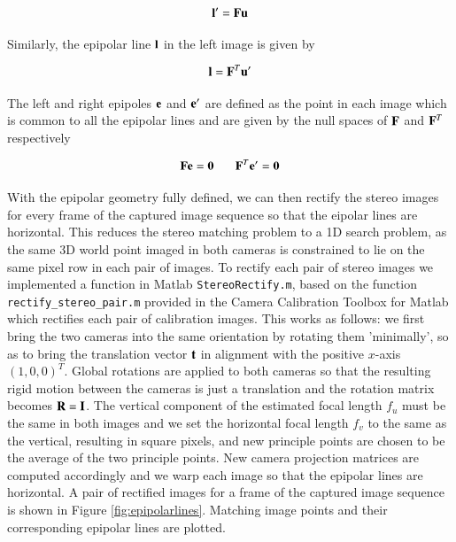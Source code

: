\begin{equation}
\mathbf{l}' = \mathbf{Fu}
\end{equation} 

Similarly, the epipolar line $\mathbf{l}$ in the left image is given by

\begin{equation*}
\mathbf{l} = \mathbf{F}^T \mathbf{u}'
\end{equation*} 

The left and right epipoles $\mathbf{e}$ and $\mathbf{e}'$ are defined as the point in each image which is common to all the epipolar lines and are given by the null spaces of $\mathbf{F}$ and $\mathbf{F}^T$ respectively

\begin{equation*}
\mathbf{Fe} = \mathbf{0} \ \ \ \ \ \ \
\mathbf{F}^T\mathbf{e}' = \mathbf{0}
\end{equation*} 

With the epipolar geometry fully defined, we can then rectify the stereo images for every frame of the captured image sequence so that the eipolar lines are horizontal. This reduces the stereo matching problem to a 1D search problem, as the same 3D world point imaged in both cameras is constrained to lie on the same pixel row in each pair of images. To rectify each pair of stereo images we implemented a function in Matlab \texttt{StereoRectify.m}, based on the function \texttt{rectify\_stereo\_pair.m} provided in the Camera Calibration Toolbox for Matlab \cite{Calib} which rectifies each pair of calibration images. This works as follows: we first bring the two cameras into the same orientation by rotating them 'minimally', so as to bring the translation vector $\mathbf{t}$ in alignment with the positive $x$-axis $(1,0,0)^T$. Global rotations are applied to both cameras so that the resulting rigid motion between the cameras is just a translation and the rotation matrix becomes $\mathbf{R} = \mathbf{I}$. The vertical component of the estimated focal length $f_u$ must be the same in both images and we set the horizontal focal length $f_v$ to the same as the vertical, resulting in square pixels, and new principle points are chosen to be the average of the two principle points. New camera projection matrices are computed accordingly and we warp each image so that the epipolar lines are horizontal. A pair of rectified images for a frame of the captured image sequence is shown in Figure \ref{fig:epipolarlines}. Matching image points and their corresponding epipolar lines are plotted.

